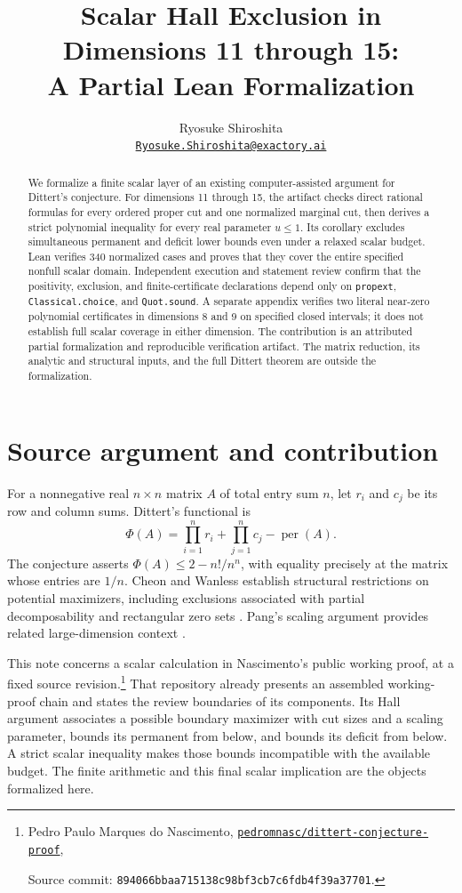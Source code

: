 \documentclass[11pt]{article}
\title{Scalar Hall Exclusion in Dimensions 11 through 15:\\A Partial Lean Formalization}
\author{Ryosuke Shiroshita\\[2pt]
\small\href{mailto:Ryosuke.Shiroshita@exactory.ai}{\texttt{Ryosuke.Shiroshita@exactory.ai}}}
\date{}
\newcommand{\code}[1]{\texttt{\small #1}}
\begin{document}
\maketitle
\begin{abstract}
We formalize a finite scalar layer of an existing computer-assisted argument
for Dittert's conjecture. For dimensions 11 through 15, the artifact checks
direct rational formulas for every ordered proper cut and one normalized
marginal cut, then derives a strict polynomial inequality for every real
parameter $u\leq 1$. Its corollary excludes simultaneous permanent and
deficit lower bounds even under a relaxed scalar budget. Lean verifies
340 normalized cases and proves that they cover the entire specified
nonfull scalar domain. Independent execution and statement review confirm
that the positivity, exclusion, and finite-certificate declarations depend
only on \code{propext}, \code{Classical.choice}, and \code{Quot.sound}.
A separate appendix verifies two literal near-zero polynomial
certificates in dimensions 8 and 9 on specified closed intervals;
it does not establish full scalar coverage in either dimension.
The contribution is an attributed partial formalization and reproducible
verification artifact. The matrix reduction, its analytic and structural
inputs, and the full Dittert theorem are outside the formalization.
\end{abstract}

\section{Source argument and contribution}

For a nonnegative real $n\times n$ matrix $A$ of total entry sum $n$, let
$r_i$ and $c_j$ be its row and column sums. Dittert's functional is
\[
 \Phi(A)=\prod_{i=1}^{n}r_i+\prod_{j=1}^{n}c_j-\operatorname{per}(A).
\]
The conjecture asserts $\Phi(A)\leq 2-n!/n^n$, with equality precisely at
the matrix whose entries are $1/n$. Cheon and Wanless establish structural
restrictions on potential maximizers, including exclusions associated
with partial decomposability and rectangular zero sets
\cite{cheon2012some}. Pang's scaling argument provides related
large-dimension context \cite{pang2026proof}.

This note concerns a scalar calculation in Nascimento's public working
proof, at a fixed source revision.\footnote{\raggedright Pedro Paulo Marques do
Nascimento, \href{https://github.com/pedromnasc/dittert-conjecture-proof/tree/894066bbaa715138c98bf3cb7c6fdb4f39a37701}{\texttt{pedromnasc/dittert-conjecture-proof}},
\par\noindent Source commit: \nolinkurl{894066bbaa715138c98bf3cb7c6fdb4f39a37701}.}
That repository already presents an assembled working-proof chain and
states the review boundaries of its components. Its Hall argument
associates a possible boundary maximizer with cut sizes and a scaling
parameter, bounds its permanent from below, and bounds its deficit from
below. A strict scalar inequality makes those bounds incompatible with
the available budget. The finite arithmetic and this final scalar
implication are the objects formalized here.
\end{document}
